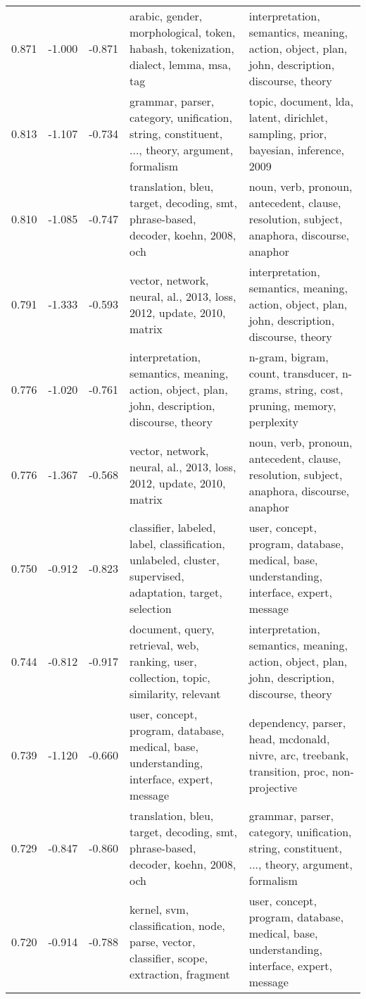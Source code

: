 \begin{tabular}{cccp{5cm}p{5cm}}
0.871 & -1.000 & -0.871 & arabic, gender, morphological, token, habash, tokenization, dialect, lemma, msa, tag & interpretation, semantics, meaning, action, object, plan, john, description, discourse, theory \\
0.813 & -1.107 & -0.734 & grammar, parser, category, unification, string, constituent, ..., theory, argument, formalism & topic, document, lda, latent, dirichlet, sampling, prior, bayesian, inference, 2009 \\
0.810 & -1.085 & -0.747 & translation, bleu, target, decoding, smt, phrase-based, decoder, koehn, 2008, och & noun, verb, pronoun, antecedent, clause, resolution, subject, anaphora, discourse, anaphor \\
0.791 & -1.333 & -0.593 & vector, network, neural, al., 2013, loss, 2012, update, 2010, matrix & interpretation, semantics, meaning, action, object, plan, john, description, discourse, theory \\
0.776 & -1.020 & -0.761 & interpretation, semantics, meaning, action, object, plan, john, description, discourse, theory & n-gram, bigram, count, transducer, n-grams, string, cost, pruning, memory, perplexity \\
0.776 & -1.367 & -0.568 & vector, network, neural, al., 2013, loss, 2012, update, 2010, matrix & noun, verb, pronoun, antecedent, clause, resolution, subject, anaphora, discourse, anaphor \\
0.750 & -0.912 & -0.823 & classifier, labeled, label, classification, unlabeled, cluster, supervised, adaptation, target, selection & user, concept, program, database, medical, base, understanding, interface, expert, message \\
0.744 & -0.812 & -0.917 & document, query, retrieval, web, ranking, user, collection, topic, similarity, relevant & interpretation, semantics, meaning, action, object, plan, john, description, discourse, theory \\
0.739 & -1.120 & -0.660 & user, concept, program, database, medical, base, understanding, interface, expert, message & dependency, parser, head, mcdonald, nivre, arc, treebank, transition, proc, non-projective \\
0.729 & -0.847 & -0.860 & translation, bleu, target, decoding, smt, phrase-based, decoder, koehn, 2008, och & grammar, parser, category, unification, string, constituent, ..., theory, argument, formalism \\
0.720 & -0.914 & -0.788 & kernel, svm, classification, node, parse, vector, classifier, scope, extraction, fragment & user, concept, program, database, medical, base, understanding, interface, expert, message \\

\end{tabular}

